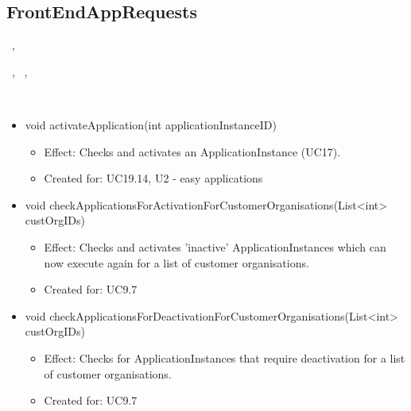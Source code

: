   \subsection{FrontEndAppRequests}\label{int:OnlineServiceOnlineServiceApplicationManagerApplicationManagementLogicFrontEndAppRequests}
    \begin{description}
      \item[Provided by:] \iconcomponent{}~, \iconcomponent{}~
      \item[Required by:] \iconcomponent{}~, \iconcomponent{}~, \iconcomponent{}~
      \item[Operations:] ~
    \begin{itemize}[noitemsep,nolistsep,leftmargin=-.25cm]
      \item \textsf{void activateApplication(int applicationInstanceID)}
        \begin{itemize}[noitemsep,nolistsep]
           \item Effect: Checks and activates an ApplicationInstance (UC17).
\item Created for: UC19.14, U2 - easy applications
        \end{itemize}
      \item \textsf{void checkApplicationsForActivationForCustomerOrganisations(List\textless{}int\textgreater{} custOrgIDs)}
        \begin{itemize}[noitemsep,nolistsep]
           \item Effect: Checks and activates 'inactive' ApplicationInstances which can now execute again for a list of customer organisations.
\item Created for: UC9.7
        \end{itemize}
      \item \textsf{void checkApplicationsForDeactivationForCustomerOrganisations(List\textless{}int\textgreater{} custOrgIDs)}
        \begin{itemize}[noitemsep,nolistsep]
           \item Effect: Checks for ApplicationInstances that require deactivation for a list of customer organisations.
\item Created for: UC9.7

\end{itemize}
\end{itemize}
\end{description}
